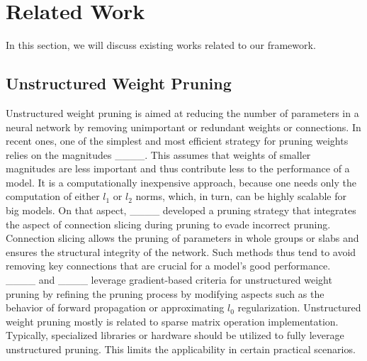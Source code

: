 \section{Related Work}
In this section, we will discuss existing works related to our framework.


\subsection{Unstructured Weight Pruning} 
Unstructured weight pruning is aimed at reducing the number of parameters in a neural network by removing unimportant or redundant weights or connections. In recent ones, one of the simplest and most efficient strategy for pruning weights relies on the magnitudes ____. This assumes that weights of smaller magnitudes are less important and thus contribute less to the performance of a model. It is a computationally inexpensive approach, because one needs only the computation of either $l_1$ or $l_2$ norms, which, in turn, can be highly scalable for big models. On that aspect, ____ developed a pruning strategy that integrates the aspect of connection slicing during pruning to evade incorrect pruning. Connection slicing allows the pruning of parameters in whole groups or slabs and ensures the structural integrity of the network. Such methods thus tend to avoid removing key connections that are crucial for a model's good performance. ____ and ____ leverage gradient-based criteria for unstructured weight pruning by refining the pruning process by modifying aspects such as the behavior of forward propagation or approximating $l_0$ regularization. Unstructured weight pruning mostly is related to sparse matrix operation implementation. Typically, specialized libraries or hardware should be utilized to fully leverage unstructured pruning. This limits the applicability in certain practical scenarios.

